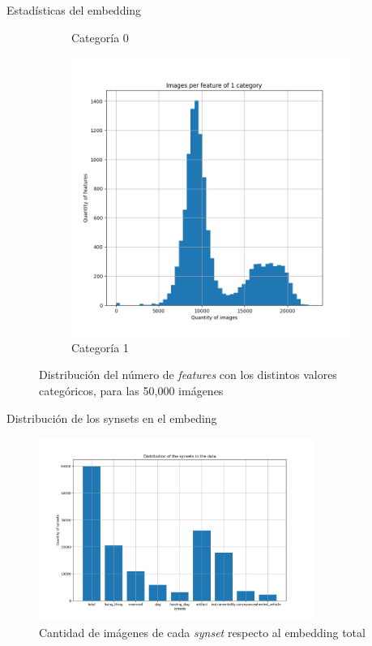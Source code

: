 \documentclass{beamer}
\begin{document}
\begin{frame}{Estadísticas del embedding}
\begin{figure}[ht]
\begin{subfigure}[b]{0.32\textwidth}
		\caption{Categoría 0}
	\end{subfigure}
	\begin{subfigure}[b]{0.32\textwidth}
		\includegraphics[width=\textwidth]  {Images/plots/25/Images_per_feature_of_1_category.png}
		\caption{Categoría 1}
	\end{subfigure}       
	\caption{Distribución del número de \textit{features} con los distintos valores categóricos, para las 50,000 imágenes  \label{fig:imagesperfeature}}
\end{figure}
\end{frame}

\begin{frame}{Distribución de los synsets en el embeding}


\begin{figure}[H] 
	\centering
	\includegraphics[width=0.8\textwidth] {Images/plots/25/distribution_of_synsets_bar.png}
		\caption{ Cantidad de imágenes de cada \textit{synset} respecto al embedding total
	\label{fig:totalsynsets}}
\end{figure}
\end{frame}
\end{document}
